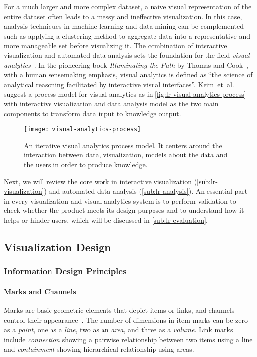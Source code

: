 For a much larger and more complex dataset, a naive visual representation of the entire dataset often leads to a messy and ineffective visualization. In this case, analysis techniques in machine learning and data mining can be complemented such as applying a clustering method to aggregate data into a representative and more manageable set before visualizing it. The combination of interactive visualization and automated data analysis sets the foundation for the field \emph{visual analytics}~\cite{Keim2008}. In the pioneering book \emph{Illuminating the Path} by Thomas and Cook~\cite{Thomas2005}, with a human sensemaking emphasis, visual analytics is defined as ``the science of analytical reasoning facilitated by interactive visual interfaces''. Keim~et~al.~\cite{Keim2010} suggest a process model for visual analytics as in \autoref{fig:lr-visual-analytics-process} with interactive visualization and data analysis model as the two main components to transform data input to knowledge output. 

\begin{figure}[!htb]
	\centering
	\texttt{[image: visual-analytics-process]}
	\caption[An iterative visual analytics process model]{An iterative visual analytics process model. It centers around the interaction between data, visualization, models about the data and the users in order to produce knowledge. }
	\label{fig:lr-visual-analytics-process}
\end{figure}

Next, we will review the core work in interactive visualization (\autoref{sub:lr-visualization}) and automated data analysis (\autoref{sub:lr-analysis}). An essential part in every visualization and visual analytics system is to perform validation to check whether the product meets its design purposes and to understand how it helps or hinder users, which will be discussed in \autoref{sub:lr-evaluation}.

\subsection{Visualization Design}
\label{sub:lr-visualization}

\subsubsection{Information Design Principles}
\label{sub:lr-design}

\paragraph{Marks and Channels}
Marks are basic geometric elements that depict items or links, and channels control their appearance~\cite{Munzner2014}. The number of dimensions in item marks can be zero as a \emph{point}, one as a \emph{line}, two as an \emph{area}, and three as a \emph{volume}. Link marks include \emph{connection} showing a pairwise relationship between two items using a line and \emph{containment} showing hierarchical relationship using areas. 

